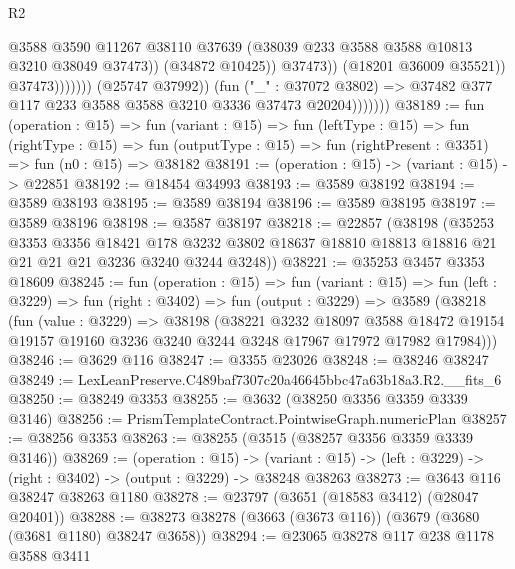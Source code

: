\begin{lexlean}{R2}
\begin{coremodule}
                                          @3588
                                          @3590
                                          @11267
                                          @38110
                                          @37639
                                          (@38039 @233 @3588 @3588 @10813 @3210 @38049 @37473))
                                        (@34872 @10425))
                                      @37473))
                                  (@18201 @36009 @35521))
                                @37473)))))))
                  (@25747 @37992))
                (fun ("_" : @37072 @3802) =>
                @37482 @377 @117 @233 @3588 @3588 @3210 @3336 @37473 @20204)))))))
@38189 := fun (operation : @15) =>
  fun (variant : @15) =>
  fun (leftType : @15) =>
  fun (rightType : @15) =>
  fun (outputType : @15) => fun (rightPresent : @3351) => fun (n0 : @15) => @38182
@38191 := (operation : @15) -> (variant : @15) -> @22851
@38192 := @18454 @34993
@38193 := @3589 @38192
@38194 := @3589 @38193
@38195 := @3589 @38194
@38196 := @3589 @38195
@38197 := @3589 @38196
@38198 := @3587 @38197
@38218 := @22857
    (@38198
      (@35253
        @3353
        @3356
        @18421
        @178
        @3232
        @3802
        @18637
        @18810
        @18813
        @18816
        @21
        @21
        @21
        @21
        @3236
        @3240
        @3244
        @3248))
@38221 := @35253 @3457 @3353 @18609
@38245 := fun (operation : @15) =>
  fun (variant : @15) =>
  fun (left : @3229) =>
  fun (right : @3402) =>
  fun (output : @3229) =>
  @3589
    (@38218
      (fun (value : @3229) =>
      @38198
        (@38221
          @3232
          @18097
          @3588
          @18472
          @19154
          @19157
          @19160
          @3236
          @3240
          @3244
          @3248
          @17967
          @17972
          @17982
          @17984)))
@38246 := @3629 @116
@38247 := @3355 @23026
@38248 := @38246 @38247
@38249 := LexLeanPreserve.C489baf7307c20a46645bbc47a63b18a3.R2.__fits_6
@38250 := @38249 @3353
@38255 := @3632 (@38250 @3356 @3359 @3339 @3146)
@38256 := PrismTemplateContract.PointwiseGraph.numericPlan
@38257 := @38256 @3353
@38263 := @38255 (@3515 (@38257 @3356 @3359 @3339 @3146))
@38269 := (operation : @15) ->
  (variant : @15) -> (left : @3229) -> (right : @3402) -> (output : @3229) -> @38248 @38263
@38273 := @3643 @116 @38247 @38263 @1180
@38278 := @23797 (@3651 (@18583 @3412) (@28047 @20401))
@38288 := @38273 @38278 (@3663 (@3673 @116)) (@3679 (@3680 (@3681 @1180) @38247 @3658))
@38294 := @23065 @38278 @117 @238 @1178 @3588 @3411

\end{coremodule}
\end{lexlean}
